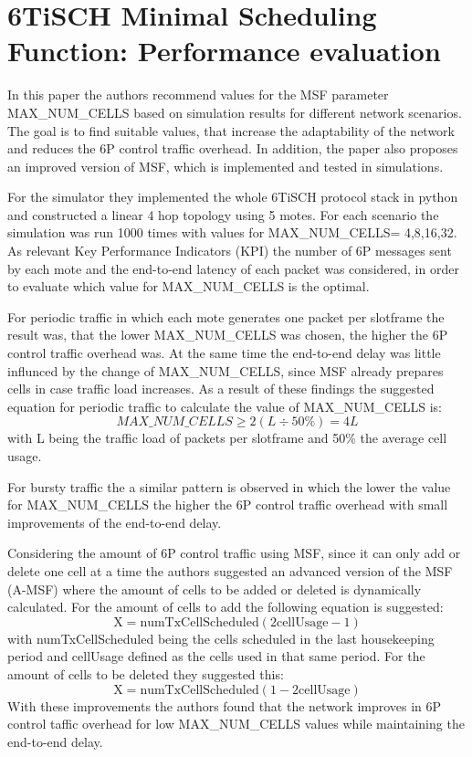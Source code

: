 \documentclass{comnets-thesis}
\begin{document}
\section{6TiSCH Minimal Scheduling Function: Performance evaluation}
In this paper \cite{MSFPerformanceEvaluation} the authors recommend values for the MSF parameter MAX\_NUM\_CELLS based on simulation results for different network scenarios. The goal is to find suitable values, that increase the adaptability of the network and reduces the 6P control traffic overhead.
In addition, the paper also proposes an improved version of MSF, which is implemented and tested in simulations.

For the simulator they implemented the whole 6TiSCH protocol stack in python and constructed a linear 4 hop topology using 5 motes. For each scenario the simulation was run 1000 times with values for MAX\_NUM\_CELLS= 4,8,16,32. As relevant Key Performance Indicators (KPI) the number of 6P messages sent by each mote and the end-to-end latency of each packet was considered, in order to evaluate which value for MAX\_NUM\_CELLS is the optimal.

For periodic traffic in which each mote generates one packet per slotframe the result was, that the lower MAX\_NUM\_CELLS was chosen, the higher the 6P control traffic overhead was. At the same time the end-to-end delay was little influnced by the change of MAX\_NUM\_CELLS, since MSF already prepares cells in case traffic load increases. As a result of these findings the suggested equation for periodic traffic to calculate the value of MAX\_NUM\_CELLS is:
\begin{equation}
    MAX\_NUM\_CELLS \geq 2  (L  \div 50\%) = 4 L
	\label{eq:max-num-cell-recommended}
\end{equation}
with L being the traffic load of packets per slotframe and 50\% the average cell usage.

For bursty traffic the a similar pattern is observed in which the lower the value for MAX\_NUM\_CELLS the higher the 6P control traffic overhead with small improvements of the end-to-end delay.

Considering the amount of 6P control traffic using MSF, since it can only add or delete one cell at a time the authors suggested an advanced version of the MSF (A-MSF) where the amount of cells to be added or deleted is dynamically calculated. For the amount of cells to add the following equation is suggested:
\begin{equation}
    \text{X} = \text{numTxCellScheduled} (2 \text{cellUsage} - 1)
	\label{eq:improved-msf-add-cells-amount}
\end{equation}
with numTxCellScheduled being the cells scheduled in the last housekeeping period and cellUsage defined as the cells used in that same period.
For the amount of cells to be deleted they suggested this:
\begin{equation}
    \text{X} = \text{numTxCellScheduled} (1 - 2 \text{cellUsage})
	\label{eq:improved-msf-delete-cells-amount}
\end{equation}
With these improvements the authors found that the network improves in 6P control taffic overhead for low MAX\_NUM\_CELLS values while maintaining the end-to-end delay. 
\end{document}
